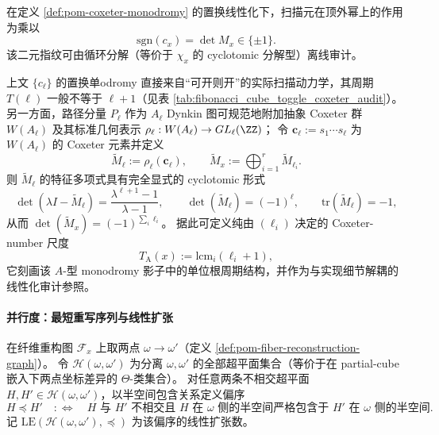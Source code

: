 \begin{corollary}\label{cor:pom-coxeter-top-sign}
在定义 \ref{def:pom-coxeter-monodromy} 的置换线性化下，扫描元在顶外幂上的作用为乘以
\[
\mathrm{sgn}(c_x)=\det M_x\in\{\pm 1\}.
\]
该二元指纹可由循环分解（等价于 \(\chi_x\) 的 cyclotomic 分解型）离线审计。
\end{corollary}

\begin{remark}\label{rem:pom-Ashadow-coxeter-monodromy}
上文 \(\{c_\ell\}\) 的置换单odromy 直接来自“可开则开”的实际扫描动力学，其周期 \(T(\ell)\) 一般不等于 \(\ell+1\)（见表 \ref{tab:fibonacci_cube_toggle_coxeter_audit}）。
另一方面，路径分量 \(P_\ell\) 作为 \(A_\ell\) Dynkin 图可规范地附加抽象 Coxeter 群 \(W(A_\ell)\) 及其标准几何表示
\(\rho_\ell:W(A_\ell)\to GL_\ell(\ZZ)\)；
令 \(\mathbf c_\ell:=s_1\cdots s_\ell\) 为 \(W(A_\ell)\) 的 Coxeter 元素并定义
\[
\widetilde M_\ell:=\rho_\ell(\mathbf c_\ell),
\qquad
\widetilde M_x:=\bigoplus_{i=1}^r \widetilde M_{\ell_i}.
\]
则 \(\widetilde M_\ell\) 的特征多项式具有完全显式的 cyclotomic 形式
\[
\det(\lambda I-\widetilde M_\ell)=\frac{\lambda^{\ell+1}-1}{\lambda-1},
\qquad
\det(\widetilde M_\ell)=(-1)^\ell,\qquad \mathrm{tr}(\widetilde M_\ell)=-1,
\]
从而 \(\det(\widetilde M_x)=(-1)^{\sum_i \ell_i}\)。
据此可定义纯由 \((\ell_i)\) 决定的 Coxeter-number 尺度
\[
T_{\mathrm A}(x):=\mathrm{lcm}_i(\ell_i+1),
\]
它刻画该 \(A\)-型 monodromy 影子中的单位根周期结构，并作为与实现细节解耦的线性化审计参照。
\end{remark}

\paragraph{并行度：最短重写序列与线性扩张}

\begin{definition}[区间超平面偏序与线性扩张数]\label{def:pom-fiber-geodesic-poset}
在纤维重构图 \(\mathcal F_x\) 上取两点 \(\omega\to \omega'\)（定义 \ref{def:pom-fiber-reconstruction-graph}）。
令 \(\mathcal H(\omega,\omega')\) 为分离 \(\omega,\omega'\) 的全部超平面集合（等价于在 partial-cube 嵌入下两点坐标差异的 \(\Theta\)-类集合）。
对任意两条不相交超平面 \(H,H'\in\mathcal H(\omega,\omega')\)，以半空间包含关系定义偏序
\[
H\preceq H'\quad:\Longleftrightarrow\quad
\text{\(H\) 与 \(H'\) 不相交且 \(H\) 在 \(\omega\) 侧的半空间严格包含于 \(H'\) 在 \(\omega\) 侧的半空间}.
\]
记 \(\mathrm{LE}(\mathcal H(\omega,\omega'),\preceq)\) 为该偏序的线性扩张数。
\end{definition}

